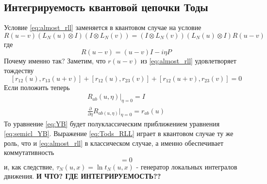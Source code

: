 \documentclass[12pt]{article}
\begin{document}
\subsection{Интегрируемость квантовой цепочки Тоды}
Условие \eqref{eq:almost_rll} заменяется в квантовом случае на условие 
\begin{equation}\label{eq:Tods_RLL}
    R(u-v)(L_N(u)\otimes I)(I \otimes L_N(v)) = (I \otimes L_N(v))(L_N(u)\otimes I)R(u-v) 
\end{equation}
где 
\begin{equation}
    R(u-v) = (u-v)I - i\eta P
\end{equation}
Почему именно так? Заметим, что $r(u-v)$ из \eqref{eq:almost_rll} удовлетворяет тождеству
\begin{equation}\label{eq:semicl_YB}
    [r_{12}(u), r_{13}(u+v)] + [r_{12}(u), r_{23}(v)] + [r_{12}(u+v), r_{23}(v)] = 0
\end{equation}
Если положить теперь 
\begin{equation}
    \begin{array}{l}
        R_{ab}(u, \eta)|_{\eta = 0} = I \\
        \frac{\partial}{\partial \eta}R_{ab(u, \eta)}|_{\eta = 0} = r_{ab}(u)
    \end{array}
\end{equation}
То уравнение \eqref{eq:YB} будет полуклассическим приближением уравнения \eqref{eq:semicl_YB}. 
Выражение \eqref{eq:Tods_RLL} играет в квантовом случае ту же роль, что и \eqref{eq:almost_rll} в классическом случае,
а именно обеспечивает коммутативность 
\begin{equation}
    [t_N(u, x), t_N(v, x)] = 0
\end{equation}
и, как следствие, $\tau_N(u,x) = \ln t_N(u, x)$ - генератор локальных интегралов движения. \textbf{И ЧТО? ГДЕ ИНТЕГРИРУЕМОСТЬ??}
\end{document}
